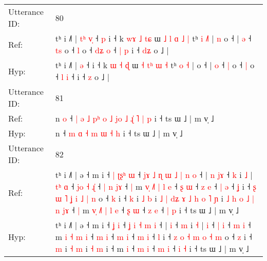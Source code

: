 \documentclass[10pt]{article}
\DeclareRobustCommand{\hl}[1]{{\textcolor{red}{#1}}}
\begin{document}
\begin{longtable}{ll}
Utterance ID: & 80 \\
Ref: & tʰ i ˩˥ |\hl{ }\hl{t}\hl{ʰ} \hl{v}\hl{̩} ˧\hl{ }\hl{p} i ˧ k \hl{w}\hl{ɤ} \hl{˩} \hl{t}\hl{ɕ} ɯ \hl{˩} \hl{l}\hl{ }\hl{ɑ} \hl{˩} \hl{|} tʰ \hl{i} \hl{˩}\hl{˥} |\hl{ }\hl{n} o ˧ | \hl{ə} ˧ \hl{t}\hl{s} o ˧ \hl{l} o ˧ \hl{d}\hl{ʑ} \hl{o} ˧\hl{ }\hl{|}\hl{ }\hl{p} i ˧ \hl{d}\hl{ʑ} o ˩ |
 \\
Hyp: & tʰ i ˩˥ |\hl{}\hl{}\hl{} \hl{}\hl{ə} ˧\hl{}\hl{} i ˧ k \hl{}\hl{ɯ} \hl{˧} \hl{}\hl{ɖ} ɯ \hl{˧} \hl{}\hl{t}\hl{ʰ} \hl{ɯ} \hl{˧} tʰ \hl{o} \hl{}\hl{˧} |\hl{}\hl{} o ˧ | \hl{o} ˧ \hl{}\hl{|} o ˧ \hl{|} o ˧ \hl{}\hl{l} \hl{i} ˧\hl{}\hl{}\hl{}\hl{} i ˧ \hl{}\hl{z} o ˩ |
 \\
\midrule
Utterance ID: & 81 \\
Ref: & n\hl{ }\hl{o} ˧\hl{ }\hl{|}\hl{ }\hl{ə}\hl{ }\hl{˩}\hl{ }\hl{p}\hl{ʰ}\hl{ }\hl{o} \hl{˩} \hl{j}\hl{o} \hl{˩} \hl{ɻ}\hl{̍} \hl{˥} \hl{|} \hl{p} i ˧ ts ɯ ˩ | m v̩ ˩
 \\
Hyp: & n\hl{}\hl{} ˧\hl{}\hl{}\hl{}\hl{}\hl{}\hl{}\hl{}\hl{}\hl{}\hl{}\hl{} \hl{m} \hl{}\hl{ɑ} \hl{˧} \hl{}\hl{m} \hl{ɯ} \hl{˧} \hl{h} i ˧ ts ɯ ˩ | m v̩ ˩
 \\
\midrule
Utterance ID: & 82 \\
Ref: & tʰ i ˩˥ | ə ˧ m i ˧\hl{ }\hl{|} \hl{ʈ}\hl{ʂ}\hl{ʰ} \hl{ɯ} ˧\hl{ }\hl{j}\hl{ɤ}\hl{ }\hl{˩}\hl{ }\hl{ɳ} \hl{ɯ} \hl{˩} \hl{|} \hl{n} \hl{o} ˧ |\hl{ }\hl{n} \hl{j}\hl{ɤ} ˧ \hl{k} i \hl{˩} |\hl{ }\hl{t}\hl{ʰ} \hl{ɑ} ˧\hl{ }\hl{j}\hl{o} \hl{˧} \hl{ɻ}\hl{̍} ˧\hl{ }\hl{|} \hl{n} \hl{j}\hl{ɤ} ˧\hl{ }\hl{|} m\hl{ }\hl{v}\hl{̩} \hl{˩}\hl{˥} \hl{|} \hl{l} \hl{e} ˧ \hl{ʂ} \hl{ɯ} ˧ \hl{z} \hl{e} ˧ \hl{|} \hl{ə} ˧ \hl{ʝ} i ˧\hl{ }\hl{ʂ} \hl{ɯ} \hl{˥} \hl{ʝ} \hl{i} \hl{˩} \hl{|} \hl{n} o ˧ \hl{k} i ˧ \hl{k} i \hl{˩} \hl{b} i\hl{ }\hl{˩}\hl{ }\hl{|}\hl{ }\hl{d}\hl{ʑ}\hl{ }\hl{ɤ}\hl{ }\hl{˩}\hl{ }\hl{h}\hl{ }\hl{o} \hl{˥} \hl{ɲ} i\hl{ }\hl{˩}\hl{ }\hl{h}\hl{ }\hl{o}\hl{ }\hl{˩}\hl{ }\hl{|}\hl{ }\hl{n}\hl{ }\hl{j}\hl{ɤ} ˧\hl{ }\hl{|} m\hl{ }\hl{v}\hl{̩}\hl{ }\hl{˩}\hl{˥}\hl{ }\hl{|}\hl{ }\hl{l} \hl{e} ˧ \hl{ʂ} \hl{ɯ} ˧ \hl{z} \hl{e} ˧ \hl{|} \hl{p} i ˧ ts ɯ ˩ | m v̩ ˩
 \\
Hyp: & tʰ i ˩˥ | ə ˧ m i ˧\hl{}\hl{} \hl{}\hl{}\hl{ʝ} \hl{i} ˧\hl{}\hl{}\hl{}\hl{}\hl{}\hl{}\hl{} \hl{ʝ} \hl{i} \hl{˧} \hl{m} \hl{i} ˧ |\hl{}\hl{} \hl{}\hl{i} ˧ \hl{m} i \hl{˧} |\hl{}\hl{}\hl{} \hl{i} ˧\hl{}\hl{}\hl{} \hl{|} \hl{}\hl{i} ˧\hl{}\hl{} \hl{m} \hl{}\hl{i} ˧\hl{}\hl{} m\hl{}\hl{}\hl{} \hl{}\hl{i} \hl{˧} \hl{m} \hl{i} ˧ \hl{m} \hl{i} ˧ \hl{m} \hl{i} ˧ \hl{m} \hl{i} ˧ \hl{l} i ˧\hl{}\hl{} \hl{z} \hl{o} \hl{˧} \hl{m} \hl{o} \hl{˧} \hl{m} o ˧ \hl{z} i ˧ \hl{m} i \hl{˧} \hl{m} i\hl{}\hl{}\hl{}\hl{}\hl{}\hl{}\hl{}\hl{}\hl{}\hl{}\hl{}\hl{}\hl{}\hl{}\hl{} \hl{˧} \hl{m} i\hl{}\hl{}\hl{}\hl{}\hl{}\hl{}\hl{}\hl{}\hl{}\hl{}\hl{}\hl{}\hl{}\hl{}\hl{} ˧\hl{}\hl{} m\hl{}\hl{}\hl{}\hl{}\hl{}\hl{}\hl{}\hl{}\hl{}\hl{} \hl{i} ˧ \hl{m} \hl{i} ˧ \hl{m} \hl{i} ˧ \hl{i} \hl{˧} i ˧ ts ɯ ˩ | m v̩ ˩

\end{longtable}
\end{document}
